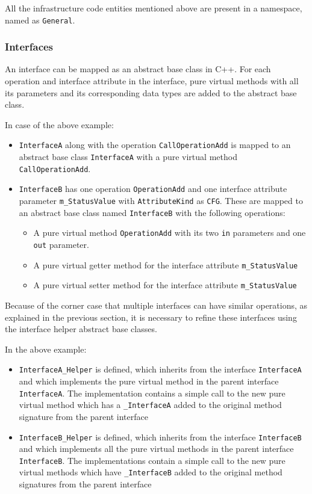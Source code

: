 All the infrastructure code entities mentioned above are present in a namespace, named as \texttt{General}.  

\subsubsection{\textbf{Interfaces}}
An interface can be mapped as an abstract base class in C++. For each operation and interface attribute in the interface, pure virtual methods with all its parameters and its corresponding data types are added to the abstract base class.

In case of the above example:
\begin{itemize}
\item \texttt{InterfaceA} along with the operation \texttt{CallOperationAdd} is mapped to an abstract base class \texttt{InterfaceA} with a pure virtual method \texttt{CallOperationAdd}. 
\item \texttt{InterfaceB} has one operation \texttt{OperationAdd} and one interface attribute parameter \texttt{m\_StatusValue} with \texttt{AttributeKind} as \texttt{CFG}. These are mapped to an abstract base class named \texttt{InterfaceB} with the following operations:
\begin{itemize}
\item A pure virtual method \texttt{OperationAdd} with its two \texttt{in} parameters and one \texttt{out} parameter.
\item A pure virtual getter method for the interface attribute \texttt{m\_StatusValue}
\item A pure virtual setter method for the interface attribute \texttt{m\_StatusValue}
\end{itemize} 
\end{itemize}

Because of the corner case that multiple interfaces can have similar operations, as explained in the previous section, it is necessary to refine these interfaces using the interface helper abstract base classes.

In the above example:
\begin{itemize}
\item \texttt{InterfaceA\allowbreak\_Helper} is defined, which inherits from the interface \texttt{InterfaceA} and which implements the pure virtual method in the parent interface \texttt{InterfaceA}. The implementation contains a simple call to the new pure virtual method which has a  \texttt{\_InterfaceA} added to the original method signature from the parent interface

\item \texttt{InterfaceB\allowbreak\_Helper} is defined, which inherits from the interface \texttt{InterfaceB} and which implements all the pure virtual methods in the parent interface \texttt{InterfaceB}. The implementations contain a simple call to the new pure virtual methods which have \texttt{\_InterfaceB} added to the original method signatures from the parent interface    
\end{itemize}

